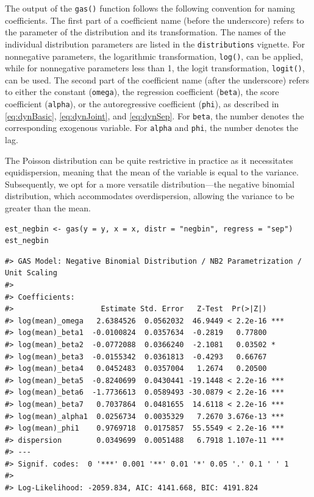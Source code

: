 The output of the \texttt{gas()} function follows the following convention for naming coefficients. The first part of a coefficient name (before the underscore) refers to the parameter of the distribution and its transformation. The names of the individual distribution parameters are listed in the \texttt{distributions} vignette. For nonnegative parameters, the logarithmic transformation, \texttt{log()}, can be applied, while for nonnegative parameters less than 1, the logit transformation, \texttt{logit()}, can be used. The second part of the coefficient name (after the underscore) refers to either the constant (\texttt{omega}), the regression coefficient (\texttt{beta}), the score coefficient (\texttt{alpha}), or the autoregressive coefficient (\texttt{phi}), as described in \eqref{eq:dynBasic}, \eqref{eq:dynJoint}, and \eqref{eq:dynSep}. For \texttt{beta}, the number denotes the corresponding exogenous variable. For \texttt{alpha} and \texttt{phi}, the number denotes the lag.

The Poisson distribution can be quite restrictive in practice as it necessitates equidispersion, meaning that the mean of the variable is equal to the variance. Subsequently, we opt for a more versatile distribution---the negative binomial distribution, which accommodates overdispersion, allowing the variance to be greater than the mean.

\begin{verbatim}
est_negbin <- gas(y = y, x = x, distr = "negbin", regress = "sep")
est_negbin
\end{verbatim}

\begin{verbatim}
#> GAS Model: Negative Binomial Distribution / NB2 Parametrization / Unit Scaling 
#> 
#> Coefficients: 
#>                    Estimate Std. Error   Z-Test  Pr(>|Z|)    
#> log(mean)_omega   2.6384526  0.0562032  46.9449 < 2.2e-16 ***
#> log(mean)_beta1  -0.0100824  0.0357634  -0.2819   0.77800    
#> log(mean)_beta2  -0.0772088  0.0366240  -2.1081   0.03502 *  
#> log(mean)_beta3  -0.0155342  0.0361813  -0.4293   0.66767    
#> log(mean)_beta4   0.0452483  0.0357004   1.2674   0.20500    
#> log(mean)_beta5  -0.8240699  0.0430441 -19.1448 < 2.2e-16 ***
#> log(mean)_beta6  -1.7736613  0.0589493 -30.0879 < 2.2e-16 ***
#> log(mean)_beta7   0.7037864  0.0481655  14.6118 < 2.2e-16 ***
#> log(mean)_alpha1  0.0256734  0.0035329   7.2670 3.676e-13 ***
#> log(mean)_phi1    0.9769718  0.0175857  55.5549 < 2.2e-16 ***
#> dispersion        0.0349699  0.0051488   6.7918 1.107e-11 ***
#> ---
#> Signif. codes:  0 '***' 0.001 '**' 0.01 '*' 0.05 '.' 0.1 ' ' 1
#> 
#> Log-Likelihood: -2059.834, AIC: 4141.668, BIC: 4191.824
\end{verbatim}

